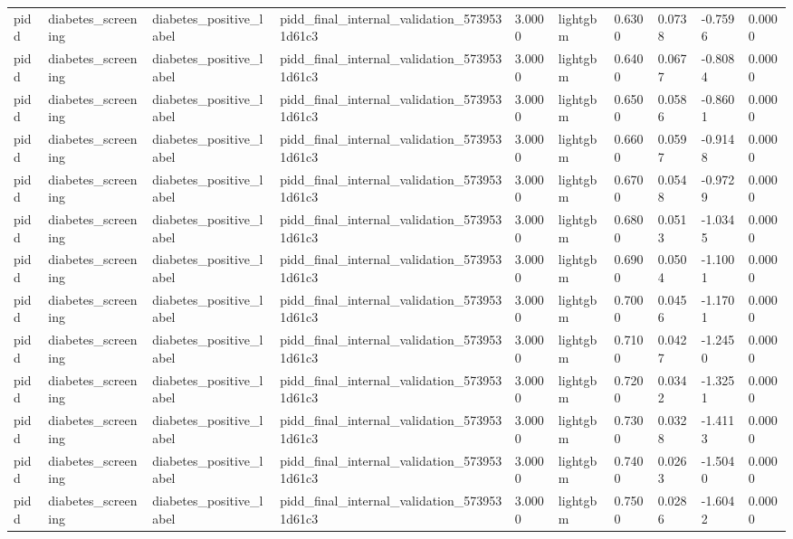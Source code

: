 \begin{tabular}{llllllllll}
pidd & diabetes\_screening & diabetes\_positive\_label & pidd\_final\_internal\_validation\_5739531d61c3 & 3.0000 & lightgbm & 0.6300 & 0.0738 & -0.7596 & 0.0000 \\
pidd & diabetes\_screening & diabetes\_positive\_label & pidd\_final\_internal\_validation\_5739531d61c3 & 3.0000 & lightgbm & 0.6400 & 0.0677 & -0.8084 & 0.0000 \\
pidd & diabetes\_screening & diabetes\_positive\_label & pidd\_final\_internal\_validation\_5739531d61c3 & 3.0000 & lightgbm & 0.6500 & 0.0586 & -0.8601 & 0.0000 \\
pidd & diabetes\_screening & diabetes\_positive\_label & pidd\_final\_internal\_validation\_5739531d61c3 & 3.0000 & lightgbm & 0.6600 & 0.0597 & -0.9148 & 0.0000 \\
pidd & diabetes\_screening & diabetes\_positive\_label & pidd\_final\_internal\_validation\_5739531d61c3 & 3.0000 & lightgbm & 0.6700 & 0.0548 & -0.9729 & 0.0000 \\
pidd & diabetes\_screening & diabetes\_positive\_label & pidd\_final\_internal\_validation\_5739531d61c3 & 3.0000 & lightgbm & 0.6800 & 0.0513 & -1.0345 & 0.0000 \\
pidd & diabetes\_screening & diabetes\_positive\_label & pidd\_final\_internal\_validation\_5739531d61c3 & 3.0000 & lightgbm & 0.6900 & 0.0504 & -1.1001 & 0.0000 \\
pidd & diabetes\_screening & diabetes\_positive\_label & pidd\_final\_internal\_validation\_5739531d61c3 & 3.0000 & lightgbm & 0.7000 & 0.0456 & -1.1701 & 0.0000 \\
pidd & diabetes\_screening & diabetes\_positive\_label & pidd\_final\_internal\_validation\_5739531d61c3 & 3.0000 & lightgbm & 0.7100 & 0.0427 & -1.2450 & 0.0000 \\
pidd & diabetes\_screening & diabetes\_positive\_label & pidd\_final\_internal\_validation\_5739531d61c3 & 3.0000 & lightgbm & 0.7200 & 0.0342 & -1.3251 & 0.0000 \\
pidd & diabetes\_screening & diabetes\_positive\_label & pidd\_final\_internal\_validation\_5739531d61c3 & 3.0000 & lightgbm & 0.7300 & 0.0328 & -1.4113 & 0.0000 \\
pidd & diabetes\_screening & diabetes\_positive\_label & pidd\_final\_internal\_validation\_5739531d61c3 & 3.0000 & lightgbm & 0.7400 & 0.0263 & -1.5040 & 0.0000 \\
pidd & diabetes\_screening & diabetes\_positive\_label & pidd\_final\_internal\_validation\_5739531d61c3 & 3.0000 & lightgbm & 0.7500 & 0.0286 & -1.6042 & 0.0000 \\

\end{tabular}
